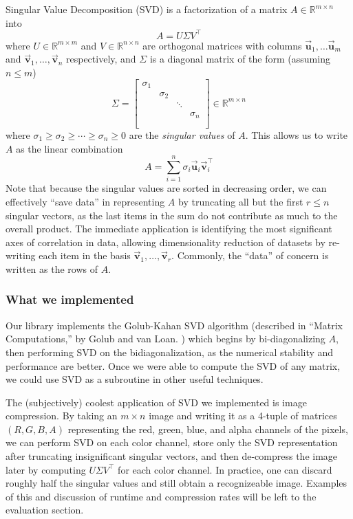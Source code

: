 \documentclass[12pt, letterpaper]{article}
\theoremstyle{definition}
\theoremstyle{remark}
\newcommand{\vect}[1]{\vec{\mathbf{#1}}}
\newcommand{\R}{\mathbb{R}}
\begin{document}
Singular Value Decomposition (SVD) is a factorization of a matrix $A \in \R^{m \times n}$ into
\[
    A = U \Sigma V^\top
\]
where $U \in \R^{m \times m}$ and $V \in \R^{n \times n}$ are orthogonal matrices with 
columns $\vect u_1, \ldots \vect u_m$ and $\vect v_1, \ldots, \vect v_n$ respectively, and $\Sigma$
is a diagonal matrix of the form (assuming $n \leq m$)
\[
    \Sigma = \left[
        \begin{array}{cccc}
            \sigma_1 & & & \\
            & \sigma_2 & & \\
            & & \ddots & \\
            & & & \sigma_n \\
            & & & \\
            & & & 
        \end{array}
    \right] \in \R^{m \times n}
\]
where $\sigma_1 \geq \sigma_2 \geq \cdots \geq \sigma_n \geq 0$ are the \emph{singular values} of $A$.
This allows us to write $A$ as the linear combination
\[
    A = \sum_{i = 1}^n \sigma_i \vect{u}_i \vect{v}_i^\top
\]
Note that because the singular values are sorted in decreasing order, we can effectively ``save data'' in 
representing $A$ by truncating all but the first $r \leq n$ singular vectors, as the last items in the sum do not 
contribute as much to the 
overall product. The immediate application is identifying the most significant axes of correlation in data, allowing 
dimensionality reduction of datasets by re-writing each item in the basis $\vect{v}_1, \ldots, \vect{v}_r$.
Commonly, the ``data'' of concern is written as the rows of $A$.

\subsubsection{What we implemented}

Our library implements the Golub-Kahan SVD algorithm (described in ``Matrix Computations,'' by Golub and van Loan.
\textcolor{blue}{\autocite{golub13}}) which begins by bi-diagonalizing $A$, then performing SVD on the bidiagonalization,
as the numerical stability and performance are better. Once we were able to compute the SVD of any matrix, we could use 
SVD as a subroutine in other useful techniques.

The (subjectively) coolest application of SVD we implemented is image compression. By taking an $m \times n$ image and 
writing it as a 4-tuple of matrices $(R, G, B, A)$ representing the red, green, blue, and alpha channels of the pixels,
we can perform SVD on each color channel, store only the SVD representation after truncating insignificant singular
vectors, and then de-compress the image later by computing $U \Sigma V^\top$ for each color channel. In practice,
one can discard roughly half the singular values and still obtain a recognizeable image. Examples of this and discussion 
of runtime and compression rates will be left to the evaluation section.
\end{document}
